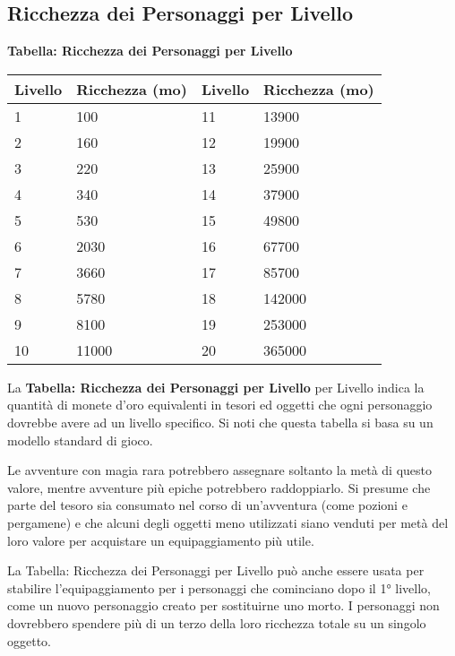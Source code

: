 \begin{multicols}{2}
\subsection{Ricchezza dei Personaggi per Livello}

\textbf{Tabella: Ricchezza dei Personaggi per Livello}

\medskip

\noindent\begin{tabularx}{\linewidth}{lX|lX}
	\toprule
\rowcolor{gray!20}\textbf{Livello} & \textbf{Ricchezza (mo)} & \textbf{Livello} & \textbf{Ricchezza (mo)}\\
\toprule
1 & 100 & 11 & 13900\\
\rowcolor{gray!20}2 & 160 & 12 & 19900\\
3 & 220 & 13 & 25900\\
\rowcolor{gray!20}4 & 340 & 14 & 37900\\
5 & 530 & 15 & 49800\\
\rowcolor{gray!20}6 & 2030 & 16 & 67700\\
7 & 3660 & 17 & 85700\\
\rowcolor{gray!20}8 & 5780 & 18 & 142000\\
9 & 8100 & 19 & 253000\\
\rowcolor{gray!20}10 & 11000 & 20 & 365000
\end{tabularx}

\medskip

La \textbf{Tabella: Ricchezza dei Personaggi per Livello} per Livello indica la quantità di monete d'oro equivalenti in tesori ed oggetti che ogni personaggio dovrebbe avere ad un livello specifico. Si noti che questa tabella si basa su un modello standard di gioco.

Le avventure con magia rara potrebbero assegnare soltanto la metà di questo valore, mentre avventure più epiche potrebbero raddoppiarlo. Si presume che parte del tesoro sia consumato nel corso di un'avventura (come pozioni e pergamene) e che alcuni degli oggetti meno utilizzati siano venduti per metà del loro valore per acquistare un equipaggiamento più utile.

La Tabella: Ricchezza dei Personaggi per Livello può anche essere usata per stabilire l'equipaggiamento per i personaggi che cominciano dopo il 1° livello, come un nuovo personaggio creato per sostituirne uno morto. I personaggi non dovrebbero spendere più di un terzo della loro ricchezza totale su un singolo oggetto.


\end{multicols}
